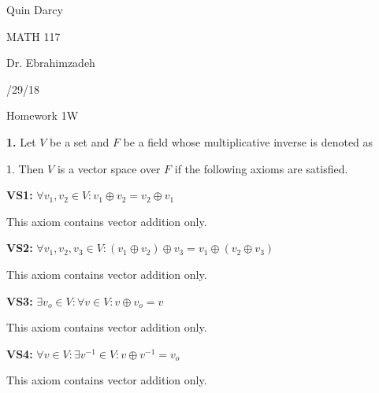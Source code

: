 \documentclass[12pt, a4paper]{article}
\begin{document}
\noindent Quin Darcy\par
\noindent MATH 117\par
\noindent Dr. Ebrahimzadeh\par
{}/29/18\par

\vspace{4mm}

\centerline{Homework 1W}

\vspace{4mm}

\noindent\textbf{1.} Let $V$ be a set and $F$ be a field whose multiplicative inverse is denoted as\par 1. Then $V$ is a vector space over $F$ if the following axioms are satisfied.\par

\begin{description}

\item\textbf{VS1:} $\forall v_1,v_2\in V\colon v_1\oplus v_2=v_2\oplus v_1$\par

\vspace{2mm}

This axiom contains vector addition only.

\vspace{4mm}

\item\textbf{VS2:} $\forall v_1,v_2,v_3\in V\colon(v_1\oplus v_2)\oplus v_3=v_1\oplus(v_2\oplus v_3)$\par

This axiom contains vector addition only.

\vspace{4mm}

\item\textbf{VS3:} $\exists v_o\in V\colon\forall v\in V\colon v\oplus v_o=v$\par

This axiom contains vector addition only.

\vspace{4mm}

\item\textbf{VS4:} $\forall v\in V\colon\exists v^{-1}\in V\colon v\oplus v^{-1}=v_o$\par

This axiom contains vector addition only.

\vspace{4mm}


\end{description}
\end{document}

